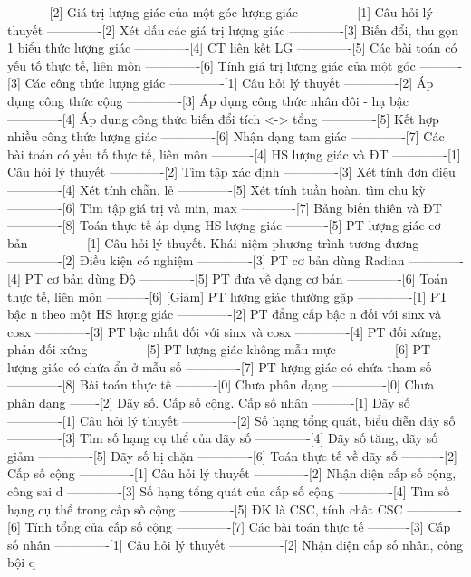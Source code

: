 ----------[2] Giá trị lượng giác của một góc lượng giác
-------------[1] Câu hỏi lý thuyết
-------------[2] Xét dấu các giá trị lượng giác
-------------[3] Biến đổi, thu gọn 1 biểu thức lượng giác
-------------[4] CT liên kết LG
-------------[5] Các bài toán có yếu tố thực tế, liên môn
-------------[6] Tính giá trị lượng giác của một góc
----------[3] Các công thức lượng giác
-------------[1] Câu hỏi lý thuyết
-------------[2] Áp dụng công thức cộng
-------------[3] Áp dụng công thức nhân đôi - hạ bậc
-------------[4] Áp dụng công thức biến đổi tích <-> tổng
-------------[5] Kết hợp nhiều công thức lượng giác
-------------[6] Nhận dạng tam giác
-------------[7] Các bài toán có yếu tố thực tế, liên môn
----------[4] HS lượng giác và ĐT
-------------[1] Câu hỏi lý thuyết
-------------[2] Tìm tập xác định
-------------[3] Xét tính đơn điệu
-------------[4] Xét tính chẵn, lẻ
-------------[5] Xét tính tuần hoàn, tìm chu kỳ
-------------[6] Tìm tập giá trị và min, max
-------------[7] Bảng biến thiên và ĐT
-------------[8] Toán thực tế áp dụng HS lượng giác
----------[5] PT lượng giác cơ bản
-------------[1] Câu hỏi lý thuyết. Khái niệm phương trình tương đương
-------------[2] Điều kiện có nghiệm
-------------[3] PT cơ bản dùng Radian
-------------[4] PT cơ bản dùng Độ
-------------[5] PT đưa về dạng cơ bản
-------------[6] Toán thực tế, liên môn
----------[6] [Giảm] PT lượng giác thường gặp
-------------[1] PT bậc n theo một HS lượng giác
-------------[2] PT đẳng cấp bậc n đối với sinx và cosx
-------------[3] PT bậc nhất đối với sinx và cosx
-------------[4] PT đối xứng, phản đối xứng
-------------[5] PT lượng giác không mẫu mực
-------------[6] PT lượng giác có chứa ẩn ở mẫu số
-------------[7] PT lượng giác có chứa tham số
-------------[8] Bài toán thực tế
----------[0] Chưa phân dạng
-------------[0] Chưa phân dạng
-------[2] Dãy số. Cấp số cộng. Cấp số nhân
----------[1] Dãy số
-------------[1] Câu hỏi lý thuyết
-------------[2] Số hạng tổng quát, biểu diễn dãy số
-------------[3] Tìm số hạng cụ thể của dãy số
-------------[4] Dãy số tăng, dãy số giảm
-------------[5] Dãy số bị chặn
-------------[6] Toán thực tế về dãy số
----------[2] Cấp số cộng
-------------[1] Câu hỏi lý thuyết
-------------[2] Nhận diện cấp số cộng, công sai d
-------------[3] Số hạng tổng quát của cấp số cộng
-------------[4] Tìm số hạng cụ thể trong cấp số cộng
-------------[5] ĐK là CSC, tính chất CSC
-------------[6] Tính tổng của cấp số cộng
-------------[7] Các bài toán thực tế
----------[3] Cấp số nhân
-------------[1] Câu hỏi lý thuyết
-------------[2] Nhận diện cấp số nhân, công bội q
